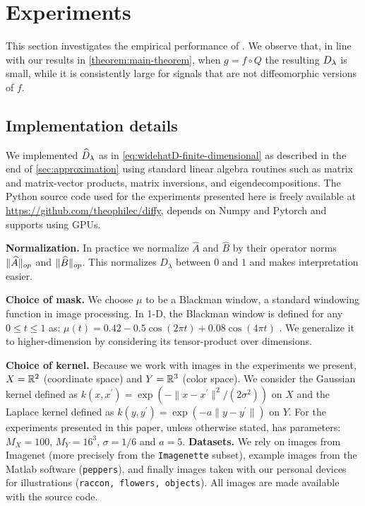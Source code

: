 




\section{Experiments}\label{sec:experiments}

This section investigates the empirical performance of \Diffy. We observe that, in line with our results in \cref{theorem:main-theorem}, when $g=f\circ Q$ the resulting $D_\lambda$ is small, while it is consistently large for signals that are not diffeomorphic versions of $f$.


\subsection{Implementation details}\label{sec:details}

We implemented $\widehat{D}_\lambda$ as in \cref{eq:widehatD-finite-dimensional} as described in the end of \cref{sec:approximation} using standard linear algebra routines such as matrix and matrix-vector products, matrix inversions, and eigendecompositions. The Python source code used for the experiments presented here is freely available at \href{https://github.com/theophilec/diffy}{https://github.com/theophilec/diffy}, depends on Numpy and Pytorch and supports using GPUs.

\textbf{Normalization.}
In practice we normalize $\widehat A$ and $\widehat B$ by their operator norms $\lVert{\widehat A}\rVert_{op}$ and $\lVert{\widehat B}\rVert_{op}$. This normalizes $D_\lambda$ between $0$ and $1$ and makes interpretation easier.

\textbf{Choice of mask.}
We choose $\mu$ to be a Blackman window, a standard windowing function in image processing. In 1-D, the Blackman window is defined for any $0 \leq t \leq 1$ as:
$\mu(t) = 0.42 - 0.5\cos(2\pi t) + 0.08 \cos(4\pi t)$ \cite{oppenheim99}.
We generalize it to higher-dimension by considering its tensor-product over dimensions.

\textbf{Choice of kernel.}
Because we work with images in the experiments we present, $X = \mathbb R^2$ (coordinate space) and $Y = \mathbb R^3$ (color space). We consider the Gaussian kernel defined as $k(x, x^\prime) = \exp(- \|x - x^\prime\|^2/(2\sigma^2))$ on $X$ and the Laplace kernel defined as $k(y, y^\prime) = \exp(-a \| y - y^\prime \|)$ on $Y$. For the experiments presented in this paper, unless otherwise stated, \Diffy has parameters: $M_X = 100$, $M_Y = 16^3$, $\sigma = 1/6$ and $a=5$.
\textbf{Datasets.}
We rely on images from Imagenet (more precisely from the \texttt{Imagenette} subset), example images from the Matlab software (\texttt{peppers}), and finally images taken with our personal devices for illustrations (\texttt{raccon, flowers, objects}). All images are made available with the source code.

